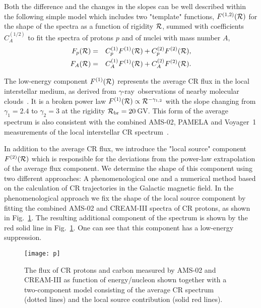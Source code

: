 \documentclass[prd,aps,twocolumn]{revtex4}
\def\gr{$\gamma$-ray}
\def\R{{\cal R}}
\begin{document}
Both the difference and the changes in the slopes can be well described 
within the following simple model which includes two "template" functions, 
$F^{(1,2)}(\R)$ for the shape of the spectra as a function of rigidity $\R$, 
summed with coefficients $C^{(1/2)}_{A}$ to fit the spectra of protons $p$ and 
of nuclei with mass number $A$,
%
\begin{eqnarray}
\label{eq:fit}
F_p(\R)&=& C^{(1)}_{p}F^{(1)}(\R) + C^{(2)}_{p}F^{(2)}(\R), \nonumber\\
F_{A}(\R)&=& C^{(1)}_{A}F^{(1)}(\R) + C^{(2)}_{A}F^{(2)}(\R) .
\end{eqnarray}
  

The low-energy component $F^{(1)}(\R)$ represents the average CR flux in 
the local interstellar medium, as derived from \gr\ observations of nearby 
molecular clouds~\cite{gouldbelt}. It is a broken power law 
$F^{(1)}(\R)\propto \R^{-\gamma_{1,2}}$ with the slope changing from $\gamma_1=2.4$
to $\gamma_2=3$ at the rigidity $\R_{\rm br}=20$\,GV. This form of the average 
spectrum is also consistent with the combined AMS-02, PAMELA and Voyager~1 
measurements of the local  interstellar CR spectrum~\cite{voyager}.


In addition to the average CR flux, we introduce the "local source" 
component $F^{(2)}(\R)$ which is responsible for the deviations from the 
power-law extrapolation of the average flux component. We determine the 
shape of this component using two different 
approaches: A phenomenological one and a numerical method based on the
calculation of CR trajectories in the Galactic magnetic field. 
In the phenomenological approach we fix the shape of the local source 
component by fitting the combined AMS-02 and CREAM-III spectra of CR protons, 
as shown in Fig.~\ref{fig:nuclei}.  The resulting additional component of 
the spectrum is shown by the red solid line in Fig.~\ref{fig:nuclei}.
One can see that this component has a low-energy suppression. 


\begin{figure}
\texttt{[image: p]}
\caption{The flux of CR protons and carbon measured by AMS-02 and 
CREAM-III as function of energy/nucleon shown together with  a 
two-component model consisting of the average CR spectrum (dotted lines) 
and the local source contribution (solid red  lines).
\label{fig:nuclei}}
\end{figure}
\end{document}
